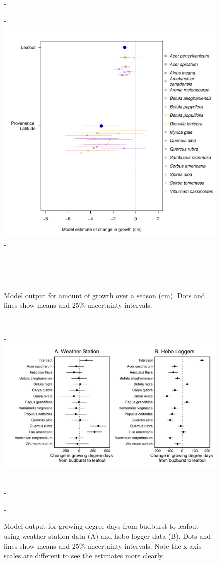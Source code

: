 \documentclass{article}\usepackage[]{graphicx}\usepackage[]{color}
\begin{document}
{{\begin{figure} [H]
  -\begin{center}
  -\includegraphics[width=12cm]{..//analyses/figures/cg_height.pdf}
  -\caption{Model output for amount of growth over a season (cm). Dots and lines show means and 25\% uncertainty intervals.}\label{fig:cg}
  -\end{center}
  -\end{figure}}

{\begin{figure} [H]
  -\begin{center}
  -\includegraphics[width=16cm]{..//analyses/figures/muplot_compare_dvr.pdf}
  -\caption{Model output for growing degree days from budburst to leafout using weather station data (A) and hobo logger data (B). Dots and lines show means and 25\% uncertainty intervals. Note the x-axis scales are different to see the estimates more clearly.}\label{fig:dvr}
  -\end{center}
  -\end{figure}}
  
}
\end{document}
